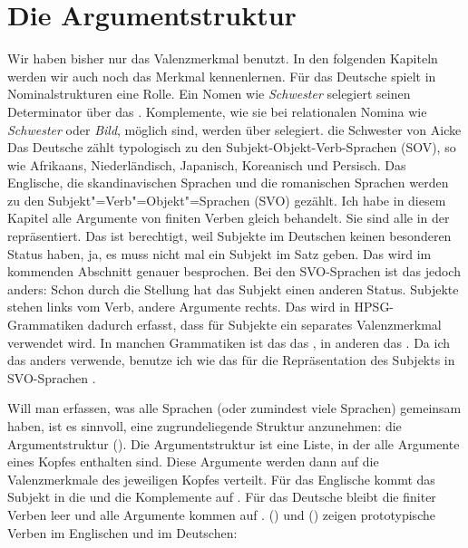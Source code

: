 \section{Die Argumentstruktur}

Wir haben bisher nur das Valenzmerkmal \comps benutzt. In den folgenden Kapiteln werden wir auch
noch das Merkmal \spr kennenlernen. Für das Deutsche spielt \spr in Nominalstrukturen eine
Rolle. Ein Nomen wie \emph{Schwester} selegiert seinen Determinator über das \sprm. Komplemente, wie
sie bei relationalen Nomina wie \emph{Schwester} oder \emph{Bild}, möglich sind, werden über \comps selegiert. 
\ea
die Schwester von Aicke
\z 
Das Deutsche zählt typologisch zu den Subjekt-Objekt-Verb-Sprachen (SOV), so wie Afrikaans,
Niederländisch, Japanisch, Koreanisch und Persisch. Das Englische, die skandinavischen Sprachen und die
romanischen Sprachen werden zu den Subjekt"=Verb"=Objekt"=Sprachen (SVO) gezählt. Ich habe in diesem Kapitel
alle Argumente von finiten Verben gleich behandelt. Sie sind alle in der \compsl repräsentiert. Das
ist berechtigt, weil Subjekte im Deutschen keinen besonderen Status haben, ja, es muss nicht mal
ein Subjekt im Satz geben. Das wird im kommenden Abschnitt genauer besprochen. Bei den SVO-Sprachen
ist das jedoch anders: Schon durch die Stellung hat das Subjekt einen anderen Status. Subjekte
stehen links vom Verb, andere Argumente rechts. Das wird in HPSG-Grammatiken dadurch erfasst, dass
für Subjekte ein separates Valenzmerkmal verwendet wird. In manchen Grammatiken ist das das \subjm,
in anderen das \sprm. Da ich das \subjm anders verwende, benutze ich wie \citet{GSag2000a-u} das \sprm
für die Repräsentation des Subjekts in SVO-Sprachen \citep{MuellerGermanic}.

Will man erfassen, was alle Sprachen (oder zumindest viele Sprachen) gemeinsam haben, ist es
sinnvoll, eine zugrundeliegende Struktur anzunehmen: die Argumentstruktur (\argst). Die Argumentstruktur ist
eine Liste, in der alle Argumente eines Kopfes enthalten sind. Diese Argumente werden dann auf die
Valenzmerkmale des jeweiligen Kopfes verteilt. Für das Englische kommt das Subjekt in die \sprl und
die Komplemente auf \comps. Für das Deutsche bleibt die \sprl finiter Verben leer und alle Argumente
kommen auf \comps. () und () zeigen prototypische Verben im Englischen und im Deutschen:

